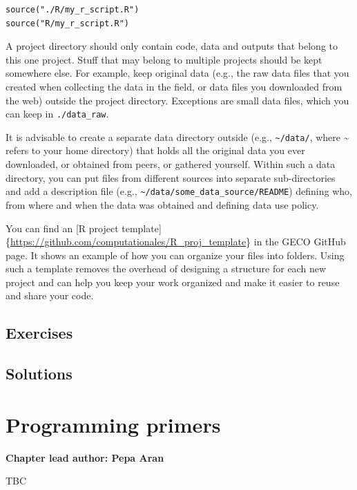 \documentclass[
]{book}
\begin{document}
\begin{verbatim}
source("./R/my_r_script.R")
source("R/my_r_script.R")
\end{verbatim}

A project directory should only contain code, data and outputs that belong to this one project. Stuff that may belong to multiple projects should be kept somewhere else. For example, keep original data (e.g., the raw data files that you created when collecting the data in the field, or data files you downloaded from the web) outside the project directory. Exceptions are small data files, which you can keep in \texttt{./data\_raw}.

It is advisable to create a separate data directory outside (e.g., \texttt{\textasciitilde{}/data/}, where \textasciitilde{} refers to your home directory) that holds all the original data you ever downloaded, or obtained from peers, or gathered yourself. Within such a data directory, you can put files from different sources into separate sub-directories and add a description file (e.g., \texttt{\textasciitilde{}/data/some\_data\_source/README}) defining who, from where and when the data was obtained and defining data use policy.

You can find an {[}R project template{]}\{\url{https://github.com/computationales/R_proj_template}\} in the GECO GitHub page. It shows an example of how you can organize your files into folders. Using such a template removes the overhead of designing a structure for each new project and can help you keep your work organized and make it easier to reuse and share your code.

\hypertarget{exercises}{%
\section{Exercises}\label{exercises}}

\hypertarget{solutions}{%
\section{Solutions}\label{solutions}}

\hypertarget{programming_primers}{%
\chapter{Programming primers}\label{programming_primers}}

\textbf{Chapter lead author: Pepa Aran}

TBC
\end{document}
